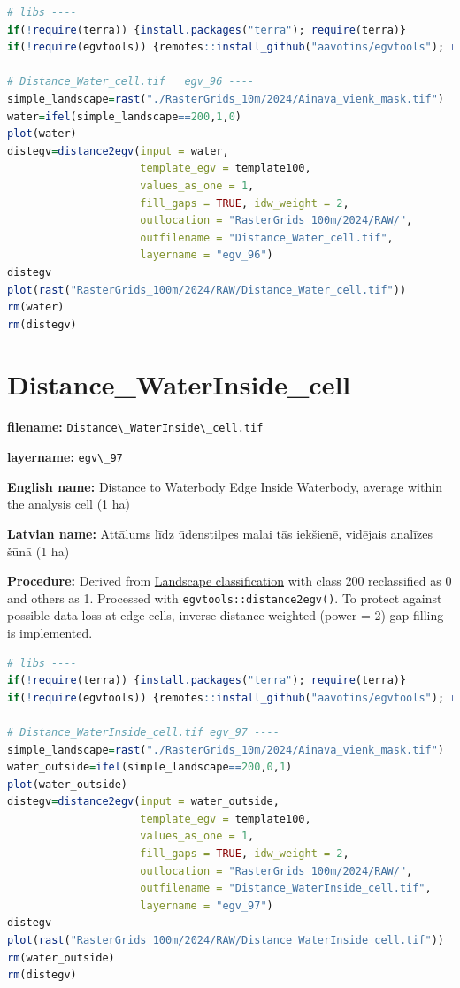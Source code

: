 \documentclass[
]{book}
\newcommand{\passthrough}[1]{#1}
\begin{document}
\begin{lstlisting}[language=R]
# libs ----
if(!require(terra)) {install.packages("terra"); require(terra)}
if(!require(egvtools)) {remotes::install_github("aavotins/egvtools"); require(egvtools)}

# Distance_Water_cell.tif   egv_96 ----
simple_landscape=rast("./RasterGrids_10m/2024/Ainava_vienk_mask.tif")
water=ifel(simple_landscape==200,1,0)
plot(water)
distegv=distance2egv(input = water,
                     template_egv = template100,
                     values_as_one = 1,
                     fill_gaps = TRUE, idw_weight = 2,
                     outlocation = "RasterGrids_100m/2024/RAW/",
                     outfilename = "Distance_Water_cell.tif",
                     layername = "egv_96")
distegv
plot(rast("RasterGrids_100m/2024/RAW/Distance_Water_cell.tif"))
rm(water)
rm(distegv)
\end{lstlisting}

\section{Distance\_WaterInside\_cell}\label{ch06.097}

\textbf{filename:} \passthrough{\lstinline!Distance\_WaterInside\_cell.tif!}

\textbf{layername:} \passthrough{\lstinline!egv\_97!}

\textbf{English name:} Distance to Waterbody Edge Inside Waterbody, average within the analysis cell (1 ha)

\textbf{Latvian name:} Attālums līdz ūdenstilpes malai tās iekšienē, vidējais analīzes šūnā (1 ha)

\textbf{Procedure:} Derived from \hyperref[Ch05.03]{Landscape classification} with class 200
reclassified as 0 and others as 1. Processed with \passthrough{\lstinline!egvtools::distance2egv()!}.
To protect against possible data loss at edge cells, inverse distance
weighted (power = 2) gap filling is implemented.

\begin{lstlisting}[language=R]
# libs ----
if(!require(terra)) {install.packages("terra"); require(terra)}
if(!require(egvtools)) {remotes::install_github("aavotins/egvtools"); require(egvtools)}

# Distance_WaterInside_cell.tif egv_97 ----
simple_landscape=rast("./RasterGrids_10m/2024/Ainava_vienk_mask.tif")
water_outside=ifel(simple_landscape==200,0,1)
plot(water_outside)
distegv=distance2egv(input = water_outside,
                     template_egv = template100,
                     values_as_one = 1,
                     fill_gaps = TRUE, idw_weight = 2,
                     outlocation = "RasterGrids_100m/2024/RAW/",
                     outfilename = "Distance_WaterInside_cell.tif",
                     layername = "egv_97")
distegv
plot(rast("RasterGrids_100m/2024/RAW/Distance_WaterInside_cell.tif"))
rm(water_outside)
rm(distegv)
\end{lstlisting}
\end{document}
